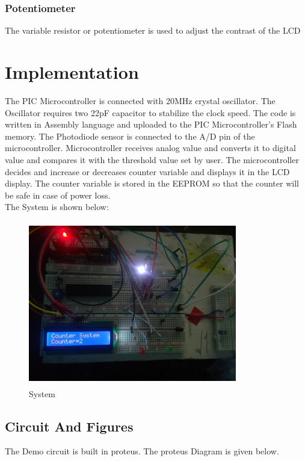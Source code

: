 \documentclass[conference]{IEEEtran}
\begin{document}
\hfil
\subsubsection{Potentiometer}
The variable resistor or potentiometer is used to adjust the contrast of the LCD

\hfil
\section{Implementation}
The PIC Microcontroller is connected with 20MHz crystal oscillator. The Oscillator requires two 22pF capacitor to stabilize the clock speed. The code is written in Assembly language and uploaded to the PIC Microcontroller’s Flash memory. The Photodiode sensor is connected to the A/D pin of the microcontroller. Microcontroller receives analog value and converts it to digital value and compares it with the threshold value set by user. The microcontroller decides and increase or decreases counter variable and displays it in the LCD display. The counter variable is stored in the EEPROM so that the counter will be safe in case of power loss.
\\
The System is shown below:

\begin{figure}[H]
  \includegraphics[width=9.1cm, height=7.2cm]{system.jpg}
  \caption{System}
\centering
  \label{fig:system}
\end{figure}
\hfill
\subsection{Circuit And Figures}


The Demo circuit is built in proteus. The proteus Diagram is given below.
\end{document}
